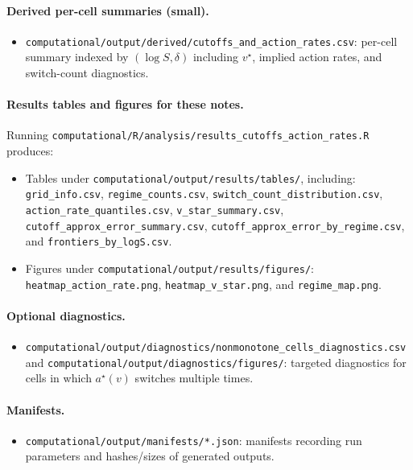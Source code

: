 \paragraph{Derived per-cell summaries (small).}
\begin{itemize}
    \item \texttt{computational/output/derived/cutoffs\_and\_action\_rates.csv}: per-cell summary indexed by
    $(\log S,\delta)$ including $v^\star$, implied action rates, and switch-count diagnostics.
\end{itemize}

\paragraph{Results tables and figures for these notes.}
Running \texttt{computational/R/analysis/results\_cutoffs\_action\_rates.R} produces:
\begin{itemize}
    \item Tables under \texttt{computational/output/results/tables/}, including:
    \texttt{grid\_info.csv},
    \texttt{regime\_counts.csv},
    \texttt{switch\_count\_distribution.csv},
    \texttt{action\_rate\_quantiles.csv},
    \texttt{v\_star\_summary.csv},
    \texttt{cutoff\_approx\_error\_summary.csv},
    \texttt{cutoff\_approx\_error\_by\_regime.csv}, and
    \texttt{frontiers\_by\_logS.csv}.
    \item Figures under \texttt{computational/output/results/figures/}:
    \texttt{heatmap\_action\_rate.png},
    \texttt{heatmap\_v\_star.png}, and
    \texttt{regime\_map.png}.
\end{itemize}

\paragraph{Optional diagnostics.}
\begin{itemize}
    \item \texttt{computational/output/diagnostics/nonmonotone\_cells\_diagnostics.csv} and
    \texttt{computational/output/diagnostics/figures/}: targeted diagnostics for cells in which $a^\star(v)$ switches
    multiple times.
\end{itemize}

\paragraph{Manifests.}
\begin{itemize}
    \item \texttt{computational/output/manifests/*.json}: manifests recording run parameters and hashes/sizes of
    generated outputs.
\end{itemize}
